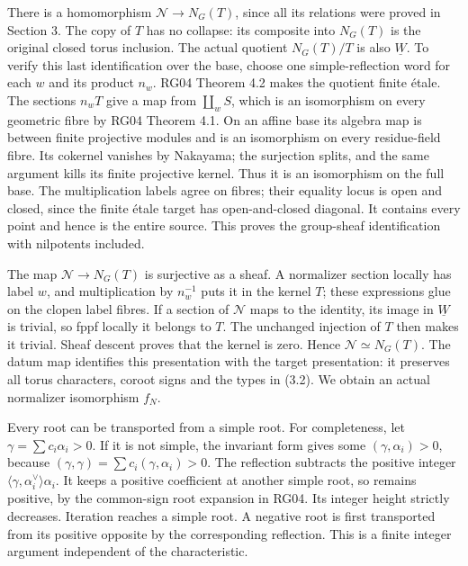 \documentclass[11pt,a4paper,openany]{report}
\begin{document}
There is a homomorphism \(\mathcal N\to N_G(T)\), since all its relations were proved in Section 3. The copy of \(T\) has no collapse: its composite into \(N_G(T)\) is the original closed torus inclusion. The actual quotient \(N_G(T)/T\) is also \(\underline W\). To verify this last identification over the base, choose one simple-reflection word for each \(w\) and its product \(n_w\). RG04 Theorem 4.2 makes the quotient finite étale. The sections \(n_wT\) give a map from \(\coprod_w S\), which is an isomorphism on every geometric fibre by RG04 Theorem 4.1. On an affine base its algebra map is between finite projective modules and is an isomorphism on every residue-field fibre. Its cokernel vanishes by Nakayama; the surjection splits, and the same argument kills its finite projective kernel. Thus it is an isomorphism on the full base. The multiplication labels agree on fibres; their equality locus is open and closed, since the finite étale target has open-and-closed diagonal. It contains every point and hence is the entire source. This proves the group-sheaf identification with nilpotents included.

The map \(\mathcal N\to N_G(T)\) is surjective as a sheaf. A normalizer section locally has label \(w\), and multiplication by \(n_w^{-1}\) puts it in the kernel \(T\); these expressions glue on the clopen label fibres. If a section of \(\mathcal N\) maps to the identity, its image in \(\underline W\) is trivial, so fppf locally it belongs to \(T\). The unchanged injection of \(T\) then makes it trivial. Sheaf descent proves that the kernel is zero. Hence \(\mathcal N\simeq N_G(T)\). The datum map identifies this presentation with the target presentation: it preserves all torus characters, coroot signs and the types in (3.2). We obtain an actual normalizer isomorphism \(f_N\).

Every root can be transported from a simple root. For completeness, let \(\gamma=\sum c_i\alpha_i>0\). If it is not simple, the invariant form gives some \((\gamma,\alpha_i)>0\), because \((\gamma,\gamma)=\sum c_i(\gamma,\alpha_i)>0\). The reflection subtracts the positive integer \(\langle\gamma,\alpha_i^\vee\rangle\alpha_i\). It keeps a positive coefficient at another simple root, so remains positive, by the common-sign root expansion in RG04. Its integer height strictly decreases. Iteration reaches a simple root. A negative root is first transported from its positive opposite by the corresponding reflection. This is a finite integer argument independent of the characteristic.
\end{document}
